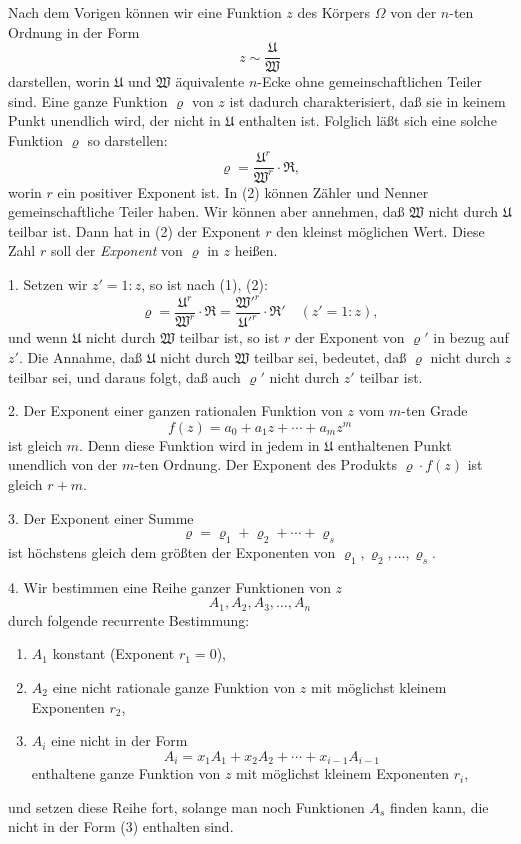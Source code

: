 \documentclass[12pt,a4paper]{article}
\begin{document}
Nach dem Vorigen können wir eine Funktion $z$ des Körpers $\Omega$ von der $n$-ten Ordnung in der Form
\begin{equation}\label{eq:193-1}
z \sim \frac{\mathfrak{U}}{\mathfrak{W}}
\end{equation}
darstellen, worin $\mathfrak{U}$ und $\mathfrak{W}$ äquivalente $n$-Ecke ohne gemeinschaftlichen Teiler sind. Eine ganze Funktion $\varrho$ von $z$ ist dadurch charakterisiert, daß sie in keinem Punkt unendlich wird, der nicht in $\mathfrak{U}$ enthalten ist. Folglich läßt sich eine solche Funktion $\varrho$ so darstellen:
\begin{equation}\label{eq:193-2}
\varrho = \frac{\mathfrak{U}^r}{\mathfrak{W}^r} \cdot \mathfrak{R},
\end{equation}
worin $r$ ein positiver Exponent ist. In (2) können Zähler und Nenner gemeinschaftliche Teiler haben. Wir können aber annehmen, daß $\mathfrak{W}$ nicht durch $\mathfrak{U}$ teilbar ist. Dann hat in (2) der Exponent $r$ den kleinst möglichen Wert. Diese Zahl $r$ soll der \emph{Exponent} von $\varrho$ in $z$ heißen.

1. Setzen wir $z' = 1:z$, so ist nach (1), (2):
\[
\varrho = \frac{\mathfrak{U}^r}{\mathfrak{W}^r} \cdot \mathfrak{R} = \frac{\mathfrak{W}'^r}{\mathfrak{U}'^r} \cdot \mathfrak{R}' \quad (z' = 1:z),
\]
und wenn $\mathfrak{U}$ nicht durch $\mathfrak{W}$ teilbar ist, so ist $r$ der Exponent von $\varrho'$ in bezug auf $z'$. Die Annahme, daß $\mathfrak{U}$ nicht durch $\mathfrak{W}$ teilbar sei, bedeutet, daß $\varrho$ nicht durch $z$ teilbar sei, und daraus folgt, daß auch $\varrho'$ nicht durch $z'$ teilbar ist.

2. Der Exponent einer ganzen rationalen Funktion von $z$ vom $m$-ten Grade
\[
f(z) = a_0 + a_1 z + \cdots + a_m z^m
\]
ist gleich $m$. Denn diese Funktion wird in jedem in $\mathfrak{U}$ enthaltenen Punkt unendlich von der $m$-ten Ordnung. Der Exponent des Produkts $\varrho \cdot f(z)$ ist gleich $r + m$.

3. Der Exponent einer Summe
\[
\varrho = \varrho_1 + \varrho_2 + \cdots + \varrho_s
\]
ist höchstens gleich dem größten der Exponenten von $\varrho_1, \varrho_2, \ldots, \varrho_s$.

4. Wir bestimmen eine Reihe ganzer Funktionen von $z$
\[
A_1, A_2, A_3, \ldots, A_n
\]
durch folgende recurrente Bestimmung:
\begin{enumerate}
\item[$1)$] $A_1$ konstant (Exponent $r_1 = 0$),
\item[$2)$] $A_2$ eine nicht rationale ganze Funktion von $z$ mit möglichst kleinem Exponenten $r_2$,
\item[$3)$] $A_i$ eine nicht in der Form
\begin{equation}\label{eq:193-3}
A_i = x_1 A_1 + x_2 A_2 + \cdots + x_{i-1} A_{i-1}
\end{equation}
enthaltene ganze Funktion von $z$ mit möglichst kleinem Exponenten $r_i$,
\end{enumerate}
und setzen diese Reihe fort, solange man noch Funktionen $A_s$ finden kann, die nicht in der Form (3) enthalten sind.
\end{document}
